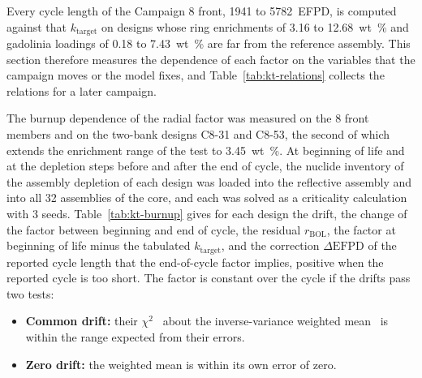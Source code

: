Every cycle length of the Campaign 8 front, 1941 to \SI{5782}{EFPD}, is
computed against that $k_\mathrm{target}$ on designs whose ring
enrichments of 3.16 to \SI{12.68}{wt\%} and gadolinia loadings of 0.18
to \SI{7.43}{wt\%} are far from the reference assembly. This section
therefore measures the dependence of each factor on the variables that
the campaign moves or the model fixes, and Table~\ref{tab:kt-relations}
collects the relations for a later campaign.

The burnup dependence of the radial factor was measured on the 8 front
members and on the two-bank designs C8-31 and C8-53, the second of
which extends the enrichment range of the test to \SI{3.45}{wt\%}. At
beginning of life and at the depletion steps before and after the end
of cycle, the nuclide inventory of the assembly depletion of each design
was loaded into the reflective assembly and into all 32 assemblies of
the core, and each was solved as a criticality calculation with 3
seeds. Table~\ref{tab:kt-burnup} gives for each design the drift, the
change of the factor between beginning and end of cycle, the residual
$r_\mathrm{BOL}$, the factor at beginning of life minus the tabulated
$k_\mathrm{target}$, and the correction $\Delta\mathrm{EFPD}$ of the
reported cycle length that the end-of-cycle factor implies, positive
when the reported cycle is too short. The factor is constant over the
cycle if the drifts pass two tests:

\begin{itemize}
  \item \textbf{Common drift:} their $\chi^2$~\cite{david_nagaraja_2003}
        about the inverse-variance weighted
        mean~\cite{lux_koblinger_1991} is within the range expected from
        their errors.
  \item \textbf{Zero drift:} the weighted mean is within its own error of
        zero.
\end{itemize}

